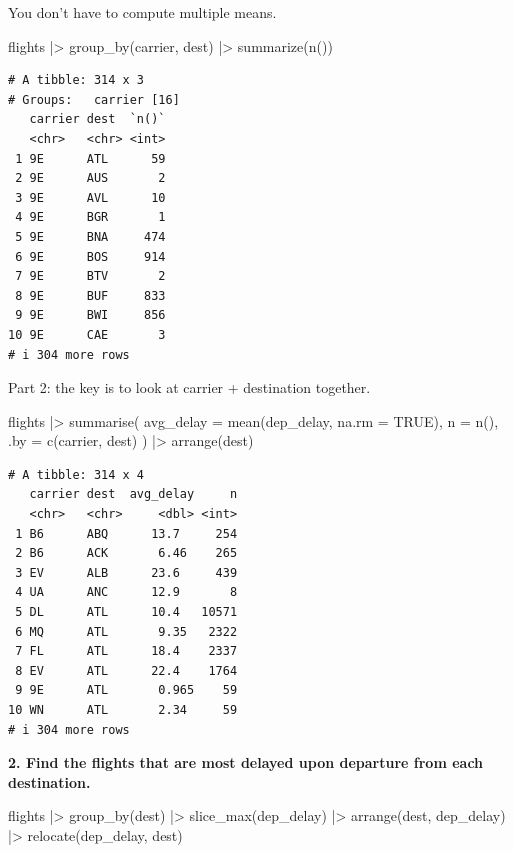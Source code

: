 \documentclass[
  letterpaper,
  DIV=11,
  numbers=noendperiod]{scrreprt}
\newenvironment{Shaded}{\begin{snugshade}}{\end{snugshade}}
\newcommand{\AttributeTok}[1]{\textcolor[rgb]{0.40,0.45,0.13}{#1}}
\newcommand{\ConstantTok}[1]{\textcolor[rgb]{0.56,0.35,0.01}{#1}}
\newcommand{\FunctionTok}[1]{\textcolor[rgb]{0.28,0.35,0.67}{#1}}
\newcommand{\NormalTok}[1]{\textcolor[rgb]{0.00,0.23,0.31}{#1}}
\newcommand{\SpecialCharTok}[1]{\textcolor[rgb]{0.37,0.37,0.37}{#1}}
\begin{document}
You don't have to compute multiple means.

\begin{Shaded}
\begin{Highlighting}[]
\NormalTok{flights }\SpecialCharTok{|\textgreater{}}
  \FunctionTok{group\_by}\NormalTok{(carrier, dest) }\SpecialCharTok{|\textgreater{}}
  \FunctionTok{summarize}\NormalTok{(}\FunctionTok{n}\NormalTok{())}
\end{Highlighting}
\end{Shaded}

\begin{verbatim}
# A tibble: 314 x 3
# Groups:   carrier [16]
   carrier dest  `n()`
   <chr>   <chr> <int>
 1 9E      ATL      59
 2 9E      AUS       2
 3 9E      AVL      10
 4 9E      BGR       1
 5 9E      BNA     474
 6 9E      BOS     914
 7 9E      BTV       2
 8 9E      BUF     833
 9 9E      BWI     856
10 9E      CAE       3
# i 304 more rows
\end{verbatim}

Part 2: the key is to look at carrier + destination together.

\begin{Shaded}
\begin{Highlighting}[]
\NormalTok{flights }\SpecialCharTok{|\textgreater{}}
  \FunctionTok{summarise}\NormalTok{(}
    \AttributeTok{avg\_delay =} \FunctionTok{mean}\NormalTok{(dep\_delay, }\AttributeTok{na.rm =} \ConstantTok{TRUE}\NormalTok{),}
    \AttributeTok{n =} \FunctionTok{n}\NormalTok{(),}
    \AttributeTok{.by =} \FunctionTok{c}\NormalTok{(carrier, dest)}
\NormalTok{  ) }\SpecialCharTok{|\textgreater{}}
  \FunctionTok{arrange}\NormalTok{(dest)}
\end{Highlighting}
\end{Shaded}

\begin{verbatim}
# A tibble: 314 x 4
   carrier dest  avg_delay     n
   <chr>   <chr>     <dbl> <int>
 1 B6      ABQ      13.7     254
 2 B6      ACK       6.46    265
 3 EV      ALB      23.6     439
 4 UA      ANC      12.9       8
 5 DL      ATL      10.4   10571
 6 MQ      ATL       9.35   2322
 7 FL      ATL      18.4    2337
 8 EV      ATL      22.4    1764
 9 9E      ATL       0.965    59
10 WN      ATL       2.34     59
# i 304 more rows
\end{verbatim}

\textbf{2. Find the flights that are most delayed upon departure from
each destination.}

\begin{Shaded}
\begin{Highlighting}[]
\NormalTok{flights }\SpecialCharTok{|\textgreater{}}
  \FunctionTok{group\_by}\NormalTok{(dest) }\SpecialCharTok{|\textgreater{}}
  \FunctionTok{slice\_max}\NormalTok{(dep\_delay) }\SpecialCharTok{|\textgreater{}}
  \FunctionTok{arrange}\NormalTok{(dest, dep\_delay) }\SpecialCharTok{|\textgreater{}}
  \FunctionTok{relocate}\NormalTok{(dep\_delay, dest)}
\end{Highlighting}
\end{Shaded}
\end{document}
